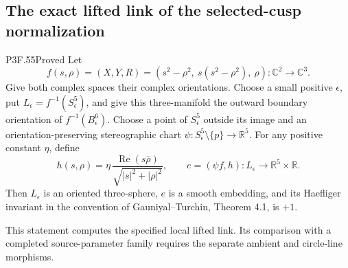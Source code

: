 \subsection{The exact lifted link of the selected-cusp normalization}
\begin{statement}{P3F.55}{Proved}
Let
\[
 f(s,\rho)=(X,Y,R)
       =(s^2-\rho^2,\ s(s^2-\rho^2),\ \rho):
                    \mathbb C^2\longrightarrow\mathbb C^3.       \tag{CL.1}
\]
Give both complex spaces their complex orientations. Choose a small positive
\(\epsilon\), put \(L_\epsilon=f^{-1}(S^5_\epsilon)\), and give this
three-manifold the outward boundary orientation of
\(f^{-1}(B^6_\epsilon)\). Choose a point of \(S^5_\epsilon\) outside its
image and an orientation-preserving stereographic chart
\(\psi:S^5_\epsilon\setminus\{p\}\to\mathbb R^5\).
For any positive constant \(\eta\), define
\[
 h(s,\rho)=\eta\,
       \frac{\operatorname{Re}(s\overline\rho)}
            {\sqrt{|s|^2+|\rho|^2}},\qquad
 e=(\psi f,h):L_\epsilon\longrightarrow\mathbb R^5\times\mathbb R.
                                                                  \tag{CL.2}
\]
Then \(L_\epsilon\) is an oriented three-sphere, \(e\) is a smooth
embedding, and its Haefliger invariant in the convention of
Gauniyal--Turchin, Theorem 4.1, is \(+1\).

This statement computes the specified local lifted link. Its comparison with a completed source-parameter family requires the separate ambient and circle-line morphisms.
\end{statement}
